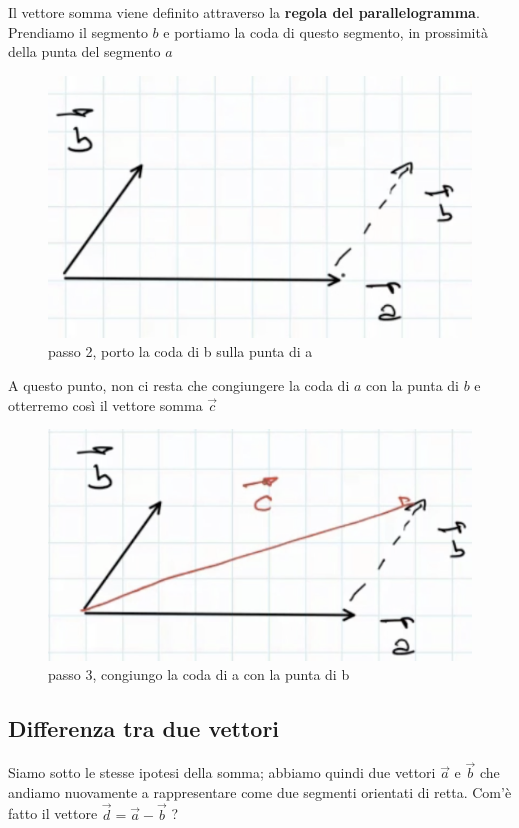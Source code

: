 Il vettore somma viene definito attraverso la \textbf{regola del parallelogramma}. Prendiamo il segmento $b$ e portiamo la coda di questo segmento, in prossimità della punta del segmento $a$

\begin{figure}[h]
\begin{center}
\includegraphics[width = 0.5 \textwidth]{lezione1/images/somma2}
\caption{passo 2, porto la coda di b sulla punta di a}
\label{fig:somma2}
\end{center}
\end{figure}

A questo punto, non ci resta che congiungere la coda di $a$ con la punta di $b$ e otterremo così il vettore somma $\overrightarrow{c}$

\begin{figure}[h]
\begin{center}
\includegraphics[width = 0.5 \textwidth]{lezione1/images/somma3}
\caption{passo 3, congiungo la coda di a con la punta di b}
\label{fig:somma3}
\end{center}
\end{figure}

\subsection{Differenza tra due vettori}
Siamo sotto le stesse ipotesi della somma; abbiamo quindi due vettori 
$\overrightarrow{a} $ e $\overrightarrow{b} $ che andiamo nuovamente a rappresentare come due segmenti orientati di retta. Com'è fatto il vettore 
$ \overrightarrow{d} = \overrightarrow{a} - \overrightarrow{b} $ ? 

